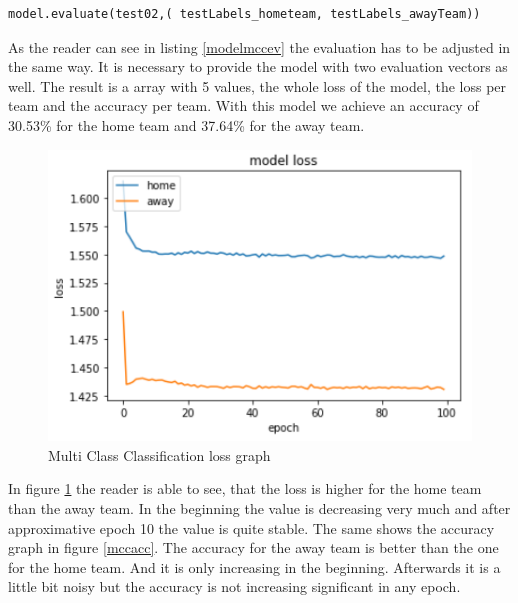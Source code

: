 \begin{lstlisting}[language=Python, caption=Python code for multi class classification model evaluation, label=modelmccev]
model.evaluate(test02,( testLabels_hometeam, testLabels_awayTeam))
\end{lstlisting}

As the reader can see in listing \ref{modelmccev} the evaluation has to be adjusted in the same way. It is necessary to provide the model with two evaluation vectors as well. The result is a array with 5 values, the whole loss of the model, the loss per team and the accuracy per team. With this model we achieve an accuracy of 30.53\% for the home team and 37.64\% for the away team. 

\begin{figure}[H]
\begin{center}
\includegraphics[scale=1.5]{images/mccloss.PNG}
\end{center}
\caption{Multi Class Classification loss graph}
\label{mccloss}
\end{figure}

In figure \ref{mccloss} the reader is able to see, that the loss is higher for the home team than the away team. In the beginning the value is decreasing very much and after approximative epoch 10 the value is quite stable. The same shows the accuracy graph in figure \ref{mccacc}. The accuracy for the away team is better than the one for the home team. And it is only increasing in the beginning. Afterwards it is a little bit noisy but the accuracy is not increasing significant in any epoch. 

